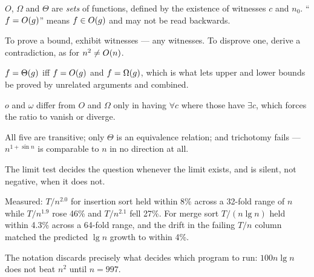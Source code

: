 \begin{chaptersummary}
\begin{tight}
  \item $O$, $\Omega$ and $\Theta$ are \emph{sets} of functions, defined by the
        existence of witnesses $c$ and $n_{0}$. ``$f = O(g)$'' means
        $f \in O(g)$ and may not be read backwards.
  \item To prove a bound, exhibit witnesses --- any witnesses. To disprove one,
        derive a contradiction, as for $n^{2} \ne O(n)$.
  \item $f = \Theta(g)$ iff $f = O(g)$ and $f = \Omega(g)$, which is what
        lets upper and lower bounds be proved by unrelated arguments and
        combined.
  \item $o$ and $\omega$ differ from $O$ and $\Omega$ only in having
        $\forall c$ where those have $\exists c$, which forces the ratio to
        vanish or diverge.
  \item All five are transitive; only $\Theta$ is an equivalence relation; and
        trichotomy fails --- $n^{1+\sin n}$ is comparable to $n$ in no
        direction at all.
  \item The limit test decides the question whenever the limit exists, and is
        silent, not negative, when it does not.
  \item Measured: $T/n^{2.0}$ for insertion sort held within 8\% across a
        32-fold range of $n$ while $T/n^{1.9}$ rose 46\% and $T/n^{2.1}$ fell
        27\%. For merge sort $T/(n\lg n)$ held within 4.3\% across a 64-fold
        range, and the drift in the failing $T/n$ column matched the predicted
        $\lg n$ growth to within 4\%.
  \item The notation discards precisely what decides which program to run:
        $100n\lg n$ does not beat $n^{2}$ until $n = 997$.
\end{tight}
\end{chaptersummary}

